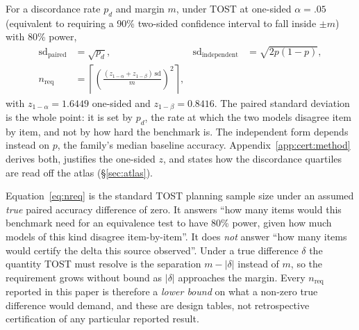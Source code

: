 For a discordance rate $p_d$ and margin $m$, under TOST at one-sided
$\alpha=.05$ (equivalent to requiring a 90\% two-sided confidence interval to
fall inside $\pm m$) with 80\% power,
\begin{align}
\mathrm{sd}_{\mathrm{paired}}      &= \sqrt{p_d}, &
\mathrm{sd}_{\mathrm{independent}} &= \sqrt{2p(1-p)}, \label{eq:sds}\\[2pt]
n_{\mathrm{req}} &= \left\lceil \left(\frac{(z_{1-\alpha} + z_{1-\beta})\,\mathrm{sd}}{m}\right)^{\!2} \right\rceil ,
\label{eq:nreq}
\end{align}
with $z_{1-\alpha} = 1.6449$ one-sided and $z_{1-\beta} = 0.8416$.
The paired standard deviation is the whole point: it is set by $p_d$, the rate
at which the two models disagree item by item, and not by how hard the benchmark
is. The independent form depends instead on $p$, the family's median baseline
accuracy. Appendix~\ref{app:cert:method} derives both, justifies the one-sided
$z$, and states how the discordance quartiles are read off the atlas
(\S\ref{sec:atlas}).

Equation~\eqref{eq:nreq} is the standard TOST planning sample size under an
assumed \emph{true} paired accuracy difference of zero. It answers ``how many
items would this benchmark need for an equivalence test to have 80\% power,
given how much models of this kind disagree item-by-item''. It does \emph{not}
answer ``how many items would certify the delta this source observed''. Under a
true difference $\delta$ the quantity TOST must resolve is the separation
$m - |\delta|$ instead of $m$, so the requirement grows without bound as
$|\delta|$ approaches the margin. Every $n_{\mathrm{req}}$ reported in this
paper is therefore a \emph{lower bound} on what a non-zero true difference would
demand, and these are design tables, not retrospective certification of any
particular reported result.

